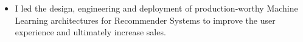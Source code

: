 \documentclass[11pt,a4paper,sans]{moderncv}        %
\begin{document}
{
\begin{itemize}%
\item I led the design, engineering and deployment of production-worthy Machine Learning architectures for Recommender Systems to improve the user experience and ultimately increase sales.
\end{itemize}
}
\vspace*{-0.15cm}

\vspace*{-0.2cm}
\end{document}
